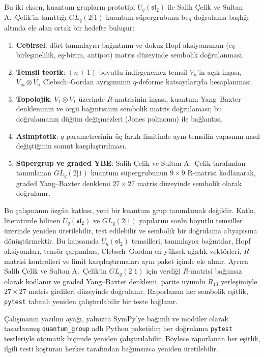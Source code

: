 \documentclass[12pt,a4paper,fleqn]{report}
\newcommand{\normalsemi}{;}
\newcommand{\normalsemi}{\begingroup\semicolonfont;\endgroup}
\numberwithin{equation}{chapter}
\theoremstyle{plain}
\theoremstyle{definition}
\renewcommand{\sl}{\mathfrak{sl}}
\newcommand{\Uq}{U_q(\sl_2)}
\begin{document}
Bu iki eksen, kuantum grupların prototipi $\Uq$ ile Salih Çelik ve Sultan A.\ Çelik'in tanıttığı
$GL_q(2|1)$ kuantum süpergrubunu beş doğrulama başlığı altında ele alan ortak bir
hedefte buluşur:
\begin{enumerate}[leftmargin=*]
  \item \textbf{Cebirsel}: dört tanımlayıcı bağıntının ve dokuz Hopf
        aksiyomunun (eş-birleşmelilik, eş-birim, antipot) matris düzeyinde
        sembolik doğrulanması.
  \item \textbf{Temsil teorik}: $(n+1)$-boyutlu indirgenemez temsil $V_n$'in
        açık inşası, $V_m \otimes V_n$ Clebsch--Gordan ayrışımının $q$-deforme
        katsayılarıyla hesaplanması.
  \item \textbf{Topolojik}: $V_1\otimes V_1$ üzerinde $R$-matrisinin
        inşası, kuantum Yang--Baxter denkleminin ve örgü bağıntısının
        sembolik matris doğrulaması\normalsemi{} bu doğrulamanın düğüm değişmezleri (Jones
        polinomu) ile bağlantısı.
  \item \textbf{Asimptotik}: $q$ parametresinin üç farklı limitinde aynı
        temsilin yapısının nasıl değiştiğinin somut karşılaştırılması.
  \item \textbf{Süpergrup ve graded YBE}: Salih Çelik ve Sultan A.\ Çelik tarafından tanımlanan
        $GL_q(2|1)$ kuantum süpergrubunun $9\times 9$ R-matrisi kodlanarak,
        graded Yang--Baxter denklemi $27\times 27$ matris düzeyinde sembolik
        olarak doğrulanır.
\end{enumerate}

Bu çalışmanın özgün katkısı, yeni bir kuantum grup tanımlamak değildir.
Katkı, literatürde bilinen $\Uq$ ve $GL_q(2|1)$ yapılarını sonlu boyutlu
temsiller üzerinde yeniden üretilebilir, test edilebilir ve sembolik bir
doğrulama altyapısına dönüştürmektir. Bu kapsamda $\Uq$ temsilleri, tanımlayıcı
bağıntılar, Hopf aksiyomları, tensör çarpımları, Clebsch--Gordan en yüksek
ağırlık vektörleri, $R$-matrisi kontrolleri ve limit karşılaştırmaları aynı
paket içinde ele alınır. Ayrıca Salih Çelik ve Sultan A.\ Çelik'in
$GL_q(2|1)$ için verdiği $R$-matrisi bağımsız olarak kodlanır ve graded
Yang--Baxter denklemi, parite uyumlu $R_{13}$ yerleşimiyle $27\times 27$
matris girdileri düzeyinde doğrulanır. Raporlanan her sembolik eşitlik,
\texttt{pytest} tabanlı yeniden çalıştırılabilir bir teste bağlanır.

Çalışmanın yazılım ayağı, yalnızca SymPy'ye bağımlı ve modüler olarak
tasarlanmış \texttt{quantum\_group} adlı Python paketidir\normalsemi{} her doğrulama
\texttt{pytest} testleriyle otomatik biçimde yeniden çalıştırılabilir. Böylece raporlanan her eşitlik, ilgili
testi koşturan herkes tarafından bağımsızca yeniden üretilebilir.
\end{document}

